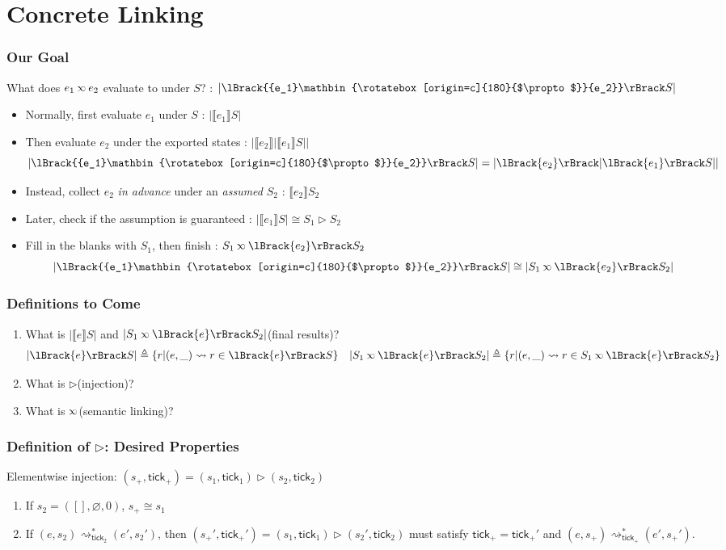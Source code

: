 \documentclass{beamer}
\newcommand*{\semarrow}{\rightsquigarrow}
\newcommand*{\semlink}{\mathbin{\rotatebox[origin=c]{180}{$\propto$}}}
\newcommand*{\link}[2]{{#1}\semlink{#2}}
\newcommand*{\sembracket}[1]{\lBrack{#1}\rBrack}
\newcommand*{\tick}{\mathsf{tick}}
\begin{document}
\section{Concrete Linking}
\begin{frame}[c]
  \frametitle{Our Goal}
  What does $\link{e_1}{e_2}$ evaluate to under $S$? : $|\sembracket{\link{e_1}{e_2}}S|$
  \begin{itemize}
    \item Normally, first evaluate $e_1$ under $S$ : $|\sembracket{e_1}S|$
    \item Then evaluate $e_2$ under the exported states : $|\sembracket{e_2}|\sembracket{e_1}S||$
          \[|\sembracket{\link{e_1}{e_2}}S|=|\sembracket{e_2}|\sembracket{e_1}S||\]
    \item Instead, collect $e_2$ \emph{in advance} under an \emph{assumed} $S_2$ : $\sembracket{e_2}S_2$
    \item Later, check if the assumption is guaranteed : $|\sembracket{e_1}S|\cong S_1\rhd S_2$
    \item Fill in the blanks with $S_1$, then finish : $S_1\semlink\sembracket{e_2}S_2$
          \[|\sembracket{\link{e_1}{e_2}}S|\cong|S_1\semlink\sembracket{e_2}S_2|\]
  \end{itemize}
\end{frame}
\begin{frame}[c]
  \frametitle{Definitions to Come}
  \begin{enumerate}
    \item What is $|\sembracket{e}S|$ and $|S_1\semlink\sembracket{e}S_2|$(final results)?
          \pause
          \[
            |\sembracket{e}S|\triangleq\{r|(e,\_)\semarrow r\in\sembracket{e}S\}\quad
            |S_1\semlink\sembracket{e}S_2|\triangleq\{r|(e,\_)\semarrow r\in S_1\semlink\sembracket{e}S_2\}
          \]

          \pause
    \item What is $\rhd$(injection)?
    \item What is $\semlink$(semantic linking)?
  \end{enumerate}
\end{frame}

\begin{frame}[c]
  \frametitle{Definition of $\rhd$: Desired Properties}
  Elementwise injection: $(s_+,\tick_+)=(s_1,\tick_1)\rhd(s_2,\tick_2)$

  \begin{enumerate}
    \item If $s_2=([],\varnothing,0)$, $s_+\cong s_1$
    \item If $(e,s_2)\semarrow_{\tick_2}^*(e',s_2')$, then $(s_+',\tick_+')=(s_1,\tick_1)\rhd(s_2',\tick_2)$ must satisfy
          $\tick_+=\tick_+'$ and $(e,s_+)\semarrow_{\tick_+}^*(e',s_+')$.
  \end{enumerate}
\end{frame}
\end{document}
